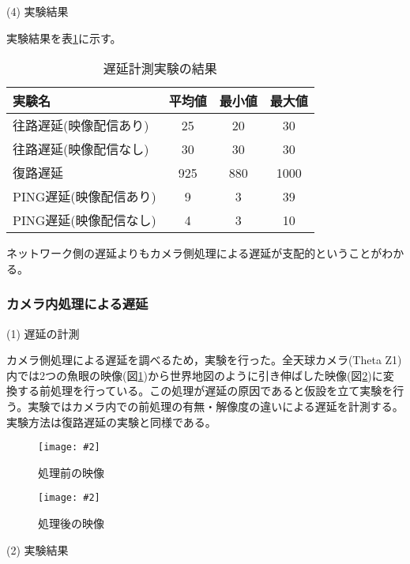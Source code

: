 \documentclass[a4paper,12pt]{jsarticle}
\newcommand{\figuref}[1]{図\ref{#1}}
\newcommand{\tabref}[1]{表\ref{#1}}
\newcommand{\fig}[4][width=\textwidth]{
    \begin{figure}[!h]
    \begin{center}
    \texttt{[image: \#2]}
    \caption{#3}
    \label{#4}
    \vspace*{-1cm}
    \end{center}
    \end{figure}
}
\begin{document}
\begin{description}
  \item[(4) 実験結果]
\end{description}\vspace{-1ex}

実験結果を\tabref{test_table}に示す。

\begin{table}[htb]
\begin{center}
\caption{遅延計測実験の結果}
\label{test_table}
\begin{tabular}{l|c|c|c}
実験名 & 平均値 & 最小値 & 最大値 \\ \hline
往路遅延(映像配信あり) & 25 & 20 & 30 \\
往路遅延(映像配信なし) & 30 & 30 & 30 \\
復路遅延 & 925 & 880 & 1000 \\
PING遅延(映像配信あり) & 9 & 3 & 39 \\
PING遅延(映像配信なし) & 4 & 3 & 10 \\
\end{tabular}
\end{center}
\end{table}

\vspace{-3mm}
ネットワーク側の遅延よりもカメラ側処理による遅延が支配的ということがわかる。

\vspace{-3mm}
\subsubsection{カメラ内処理による遅延}
\begin{description}
  \item[(1) 遅延の計測]
\end{description}\vspace{-1ex}

カメラ側処理による遅延を調べるため，実験を行った。全天球カメラ(Theta Z1)内では2つの魚眼の映像(\figuref{theta_dualfisheye})から世界地図のように引き伸ばした映像(\figuref{theta_equirectangular})に変換する前処理を行っている。この処理が遅延の原因であると仮設を立て実験を行う。実験ではカメラ内での前処理の有無・解像度の違いによる遅延を計測する。実験方法は復路遅延の実験と同様である。
\fig[width=60mm]{image/theta_dualfisheye.jpg}{処理前の映像}{theta_dualfisheye}
\fig[width=60mm]{image/theta_equirectangular.jpg}{処理後の映像}{theta_equirectangular}
\clearpage

\begin{description}
  \item[(2) 実験結果]
\end{description}\vspace{-1ex}
\end{document}
